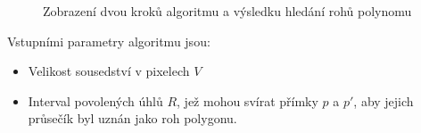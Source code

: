 \begin{figure}[H]
  \begin{center}
    \caption{Zobrazení dvou kroků algoritmu a výsledku hledání rohů polynomu}
    \label{prilohaHledaniRohuObr}
  \end{center}
\end{figure}

\noindent Vstupními parametry algoritmu jsou:
\begin{itemize}
  \item Velikost sousedství v pixelech $V$
  \item Interval povolených úhlů $R$, jež mohou svírat přímky $p$ a $p'$, aby
  jejich průsečík byl uznán jako roh polygonu. 
\end{itemize}

